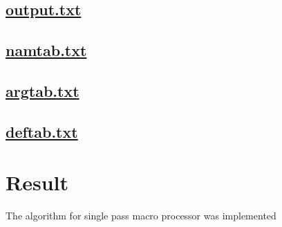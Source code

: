 \documentclass{article}
\begin{document}
\subsection*{\underline{output.txt}}

\subsection*{\underline{namtab.txt}}

\subsection*{\underline{argtab.txt}}

\subsection*{\underline{deftab.txt}}


\section*{Result}
The algorithm for single pass macro processor was implemented
\end{document}
